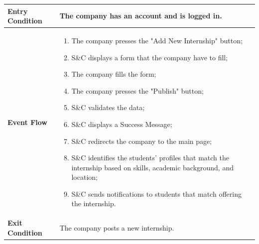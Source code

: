 \begin{enumerate}[label=\textbf{[US\arabic*]}, left = 0pt, align = left, resume]
\begin{longtable}{|l|p{11cm}|}
                \textbf{Entry Condition} & 
                    The company has an account and is logged in. \\
                \hline
                
                \textbf{Event Flow} &
                    \begin{enumerate}[label=\arabic*., itemsep=0.2em]
                        \item The company presses the "Add New Internship" button;
                        \item S\&C displays a form that the company have to fill;
                        \item The company fills the form;
                        \item The company presses the "Publish" button;
                        \item S\&C validates the data;
                        \item S\&C displays a Success Message;
                        \item S\&C redirects the company to the main page;
                        \item S\&C identifies the students' profiles that match the internship based on skills, academic background, and location;
                        \item S\&C sends notifications to students that match offering the internship.
                    \end{enumerate} \\
                \hline
                
                \textbf{Exit Condition} & 
                    The company posts a new internship. \\
                \hline
                

\end{longtable}
\end{enumerate}
